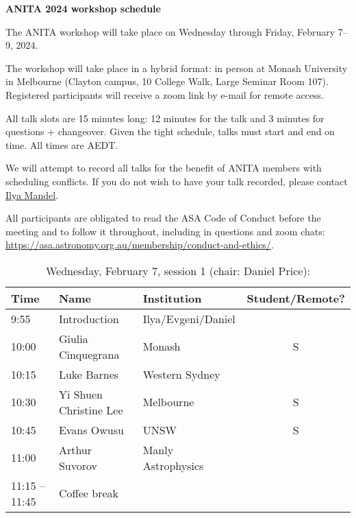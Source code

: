 \documentclass[amsmath,onecolumn]{revtex4-1}
\begin{document}
\begin{center}
{\bf ANITA 2024 workshop schedule}\\
\end{center}
\vspace{0.2in}

The ANITA workshop will take place on Wednesday through Friday, February 7--9, 2024.

The workshop will take place in a hybrid format: in person at Monash University in Melbourne (Clayton campus, 10 College Walk, Large Seminar Room 107).  Registered participants will receive a zoom link by e-mail for remote access.  


All talk slots are 15 minutes long: 12 minutes for the talk and 3 minutes for questions + changeover.  Given the tight schedule, talks must start and end on time.  All times are AEDT.


We will attempt to record all talks for the benefit of ANITA members with scheduling conflicts.  If you do not wish to have your talk recorded, please contact \href{mailto:ilya.mandel@monash.edu}{Ilya Mandel}.

All participants are obligated to read the ASA Code of Conduct before the meeting and to follow it throughout, including in questions and zoom chats:
\url{https://asa.astronomy.org.au/membership/conduct-and-ethics/}.


\FloatBarrier

\begin{table}[!htbp]
	\centering
	\caption{Wednesday, February 7, session 1 (chair: Daniel Price):}
\begin{tabular}{| l | l | l | c |}
	\hline
	Time & Name  & Institution & Student/Remote? \\ 		
	\hline
	9:55 & Introduction & Ilya/Evgeni/Daniel & \\
	\hline
	10:00 & Giulia	Cinquegrana & Monash & S\\
	10:15 & 	Luke	Barnes & Western Sydney & \\
	10:30 & Yi Shuen Christine	Lee & Melbourne&  S\\
	10:45 & Evans	Owusu & UNSW & S \\
	11:00 & Arthur	Suvorov & Manly Astrophysics & \\
	\hline
	11:15 -- 11:45 & Coffee break & & \\
	\hline
\end{tabular}
\end{table}
\end{document}
